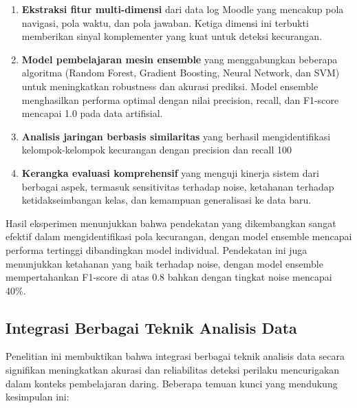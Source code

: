 \begin{enumerate}
    \item \textbf{Ekstraksi fitur multi-dimensi} dari data log Moodle yang mencakup pola navigasi, pola waktu, dan pola jawaban. Ketiga dimensi ini terbukti memberikan sinyal komplementer yang kuat untuk deteksi kecurangan.
    
    \item \textbf{Model pembelajaran mesin ensemble} yang menggabungkan beberapa algoritma (Random Forest, Gradient Boosting, Neural Network, dan SVM) untuk meningkatkan robustness dan akurasi prediksi. Model ensemble menghasilkan performa optimal dengan nilai precision, recall, dan F1-score mencapai 1.0 pada data artifisial.
    
    \item \textbf{Analisis jaringan berbasis similaritas} yang berhasil mengidentifikasi kelompok-kelompok kecurangan dengan precision dan recall 100%
    
    \item \textbf{Kerangka evaluasi komprehensif} yang menguji kinerja sistem dari berbagai aspek, termasuk sensitivitas terhadap noise, ketahanan terhadap ketidakseimbangan kelas, dan kemampuan generalisasi ke data baru.
\end{enumerate}

Hasil eksperimen menunjukkan bahwa pendekatan yang dikembangkan sangat efektif dalam mengidentifikasi pola kecurangan, dengan model ensemble mencapai performa tertinggi dibandingkan model individual. Pendekatan ini juga menunjukkan ketahanan yang baik terhadap noise, dengan model ensemble mempertahankan F1-score di atas 0.8 bahkan dengan tingkat noise mencapai 40\%.

\subsection{Integrasi Berbagai Teknik Analisis Data}

Penelitian ini membuktikan bahwa integrasi berbagai teknik analisis data secara signifikan meningkatkan akurasi dan reliabilitas deteksi perilaku mencurigakan dalam konteks pembelajaran daring. Beberapa temuan kunci yang mendukung kesimpulan ini:

